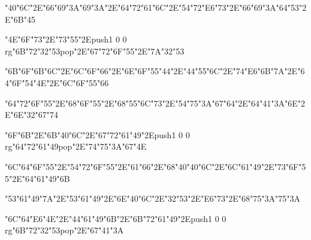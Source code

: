 \centerline{\ipa\char"40\ipa\char"6C\ipa\char"2E\ipa\char"66\ipa\char"69\ipa\char"3A\ipa\char"69\ipa\char"3A\ipa\char"2E\ipa\char"64\ipa\char"72\ipa\char"61\ipa\char"6C\ipa\char"2E\ipa\char"54\ipa\char"72\ipa\char"E6\ipa\char"73\ipa\char"2E\ipa\char"66\ipa\char"69\ipa\char"3A\ipa\char"64\ipa\char"53\ipa\char"2E\ipa\char"6B\ipa\char"45}
\vfill\eject
\null\vfill
\centerline{\ipa\char"4E\ipa\char"6F\ipa\char"73\ipa\char"2E\ipa\char"73\ipa\char"55\ipa\char"2E\pdfcolorstack\match push{1 0 0 rg}\ipa\char"6B\ipa\char"72\ipa\char"32\ipa\char"53\pdfcolorstack\match pop{}\ipa\char"2E\ipa\char"67\ipa\char"72\ipa\char"6F\ipa\char"55\ipa\char"2E\ipa\char"7A\ipa\char"32\ipa\char"53}\bigskip
\centerline{\ipa\char"6B\ipa\char"6F\ipa\char"6B\ipa\char"6C\ipa\char"2E\ipa\char"6C\ipa\char"6F\ipa\char"66\ipa\char"2E\ipa\char"6E\ipa\char"6F\ipa\char"55\ipa\char"44\ipa\char"2E\ipa\char"44\ipa\char"55\ipa\char"6C\ipa\char"2E\ipa\char"74\ipa\char"E6\ipa\char"6B\ipa\char"7A\ipa\char"2E\ipa\char"64\ipa\char"6F\ipa\char"54\ipa\char"4E\ipa\char"2E\ipa\char"6C\ipa\char"6F\ipa\char"55\ipa\char"66}\bigskip
\centerline{\ipa\char"64\ipa\char"72\ipa\char"6F\ipa\char"55\ipa\char"2E\ipa\char"68\ipa\char"6F\ipa\char"55\ipa\char"2E\ipa\char"68\ipa\char"55\ipa\char"6C\ipa\char"73\ipa\char"2E\ipa\char"54\ipa\char"75\ipa\char"3A\ipa\char"67\ipa\char"64\ipa\char"2E\ipa\char"64\ipa\char"41\ipa\char"3A\ipa\char"6E\ipa\char"2E\ipa\char"6E\ipa\char"32\ipa\char"67\ipa\char"74}
\vfill\eject
\null\vfill
\centerline{\ipa\char"6F\ipa\char"6B\ipa\char"2E\ipa\char"6B\ipa\char"40\ipa\char"6C\ipa\char"2E\ipa\char"67\ipa\char"72\ipa\char"61\ipa\char"49\ipa\char"2E\pdfcolorstack\match push{1 0 0 rg}\ipa\char"64\ipa\char"72\ipa\char"61\ipa\char"49\pdfcolorstack\match pop{}\ipa\char"2E\ipa\char"74\ipa\char"75\ipa\char"3A\ipa\char"67\ipa\char"4E}\bigskip
\centerline{\ipa\char"6C\ipa\char"64\ipa\char"6F\ipa\char"55\ipa\char"2E\ipa\char"54\ipa\char"72\ipa\char"6F\ipa\char"55\ipa\char"2E\ipa\char"61\ipa\char"66\ipa\char"2E\ipa\char"68\ipa\char"40\ipa\char"40\ipa\char"6C\ipa\char"2E\ipa\char"6C\ipa\char"61\ipa\char"49\ipa\char"2E\ipa\char"73\ipa\char"6F\ipa\char"55\ipa\char"2E\ipa\char"64\ipa\char"61\ipa\char"49\ipa\char"6B}\bigskip
\centerline{\ipa\char"53\ipa\char"61\ipa\char"49\ipa\char"7A\ipa\char"2E\ipa\char"53\ipa\char"61\ipa\char"49\ipa\char"2E\ipa\char"6E\ipa\char"40\ipa\char"6C\ipa\char"2E\ipa\char"32\ipa\char"53\ipa\char"2E\ipa\char"E6\ipa\char"73\ipa\char"2E\ipa\char"68\ipa\char"75\ipa\char"3A\ipa\char"75\ipa\char"3A}
\vfill\eject
\null\vfill
\centerline{\ipa\char"6C\ipa\char"64\ipa\char"E6\ipa\char"4E\ipa\char"2E\ipa\char"44\ipa\char"61\ipa\char"49\ipa\char"6B\ipa\char"2E\ipa\char"6B\ipa\char"72\ipa\char"61\ipa\char"49\ipa\char"2E\pdfcolorstack\match push{1 0 0 rg}\ipa\char"6B\ipa\char"72\ipa\char"32\ipa\char"53\pdfcolorstack\match pop{}\ipa\char"2E\ipa\char"67\ipa\char"41\ipa\char"3A}\bigskip
